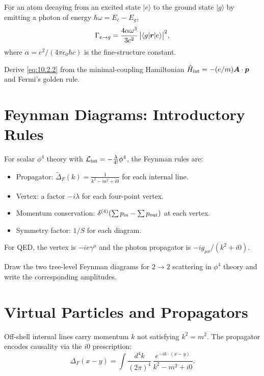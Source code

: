 For an atom decaying from an excited state $|e\rangle$ to the ground state
$|g\rangle$ by emitting a photon of energy $\hbar\omega=E_e-E_g$,
\begin{equation}
\Gamma_{e\to g} = \frac{4\alpha\omega^3}{3c^2}\,
\bigl|\langle g|\bm{r}|e\rangle\bigr|^2,
\label{eq:10.2.2}
\end{equation}
where $\alpha=e^2/(4\pi\epsilon_0\hbar c)$ is the fine-structure constant.

\begin{exercise}
Derive \eqref{eq:10.2.2} from the minimal-coupling Hamiltonian
$\hat H_{\rm int}=-(e/m)\bm{A}\cdot\bm{p}$ and Fermi's golden rule.
\end{exercise}

\section{Feynman Diagrams: Introductory Rules}

For scalar $\phi^4$ theory with $\mathcal L_{\rm int}=-\frac{\lambda}{4!}\phi^4$,
the Feynman rules are:
\begin{itemize}
\item Propagator: $\tilde\Delta_F(k)=\frac{1}{k^2-m^2+i0}$ for each internal line.
\item Vertex: a factor $-i\lambda$ for each four-point vertex.
\item Momentum conservation: $\delta^{(4)}(\sum p_{\rm in}-\sum p_{\rm out})$
      at each vertex.
\item Symmetry factor: $1/S$ for each diagram.
\end{itemize}

For QED, the vertex is $-ie\gamma^\mu$ and the photon propagator is
$-ig_{\mu\nu}/(k^2+i0)$.

\begin{exercise}
Draw the two tree-level Feynman diagrams for $2\to2$ scattering in
$\phi^4$ theory and write the corresponding amplitudes.
\end{exercise}

\section{Virtual Particles and Propagators}

Off-shell internal lines carry momentum $k$ not satisfying $k^2=m^2$.
The propagator encodes causality via the $i0$ prescription:
\begin{equation}
\Delta_F(x-y) = \int\frac{d^4k}{(2\pi)^4}\,
\frac{e^{-ik\cdot(x-y)}}{k^2-m^2+i0}.
\label{eq:10.4.1}
\end{equation}

